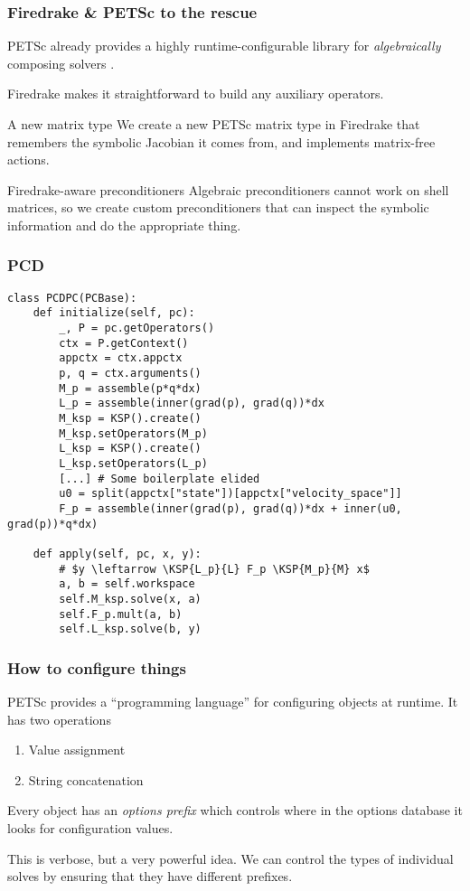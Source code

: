 \documentclass[presentation]{beamer}
\newcommand{\KSP}[2]{\ensuremath{\mathcal{K}\left(#1, \mathbb{#2}\right)}}
\begin{document}
\begin{frame}[fragile]
  \frametitle{Firedrake \& PETSc to the rescue}
  PETSc already provides a highly runtime-configurable library for
  \emph{algebraically} composing solvers \parencite{Brown:2012}.

  Firedrake makes it straightforward to build any auxiliary
  operators.

  \begin{block}{A new matrix type}
    We create a new PETSc matrix type in Firedrake that remembers the
    symbolic Jacobian it comes from, and implements matrix-free
    actions.
  \end{block}
  \begin{block}{Firedrake-aware preconditioners}
    Algebraic preconditioners cannot work on shell matrices, so we
    create custom preconditioners that can inspect the symbolic
    information and do the appropriate thing.
  \end{block}
\end{frame}

\begin{frame}[fragile]
  \frametitle{PCD}

\begin{verbatim}
class PCDPC(PCBase):
    def initialize(self, pc):
        _, P = pc.getOperators()
        ctx = P.getContext()
        appctx = ctx.appctx
        p, q = ctx.arguments()
        M_p = assemble(p*q*dx)
        L_p = assemble(inner(grad(p), grad(q))*dx
        M_ksp = KSP().create()
        M_ksp.setOperators(M_p)
        L_ksp = KSP().create()
        L_ksp.setOperators(L_p)
        [...] # Some boilerplate elided
        u0 = split(appctx["state"])[appctx["velocity_space"]]
        F_p = assemble(inner(grad(p), grad(q))*dx + inner(u0, grad(p))*q*dx)

    def apply(self, pc, x, y):
        # $y \leftarrow \KSP{L_p}{L} F_p \KSP{M_p}{M} x$
        a, b = self.workspace
        self.M_ksp.solve(x, a)
        self.F_p.mult(a, b)
        self.L_ksp.solve(b, y)
\end{verbatim}
\end{frame}

\begin{frame}
  \frametitle{How to configure things}

  PETSc provides a ``programming language'' for configuring objects at
  runtime.  It has two operations

  \begin{enumerate}
  \item Value assignment
  \item String concatenation
  \end{enumerate}

  Every object has an \emph{options prefix} which controls where in
  the options database it looks for configuration values.

  This is verbose, but a very powerful idea.  We can control the types
  of individual solves by ensuring that they have different prefixes.
\end{frame}
\end{document}
